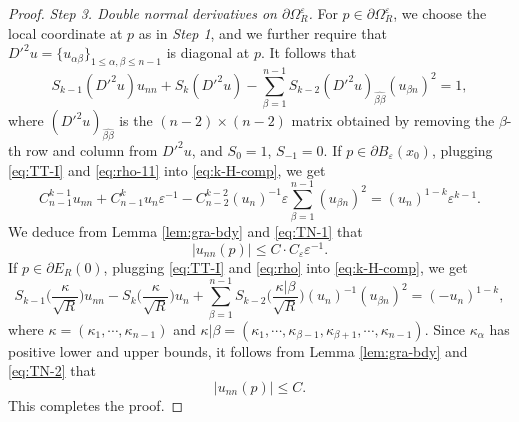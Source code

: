 \documentclass[reqno]{amsart}
\theoremstyle{remark}
\theoremstyle{definition}
\numberwithin{equation}{section}
\begin{document}
\begin{proof}
	\textit{Step 3. Double normal derivatives on $\partial\Omega_R^\varepsilon$.} For $p\in\partial\Omega_R^\varepsilon$, we choose the local coordinate at $p$ as in \textit{Step 1}, and we further require that $D'^2 u = \{u_{\alpha\beta}\}_{1 \leq \alpha, \beta \leq n-1}$ is diagonal at $p$. It follows that
    \begin{equation}\label{eq:k-H-comp}
	S_{k-1}(D'^2 u)u_{nn} + S_k(D'^2 u) - \sum_{\beta=1}^{n-1} S_{k-2}(D'^2 u )_{\widehat{\beta\beta}}(u_{\beta n})^2 = 1, 
	\end{equation}
	where $(D'^2 u)_{\widehat{\beta\beta}}$ is the $(n-2) \times (n-2)$ matrix obtained by removing the $\beta$-th row and column from $D'^2 u$, and $S_0=1$, $S_{-1}=0$. If $p\in\partial B_\varepsilon(x_0)$, plugging \eqref{eq:TT-I} and \eqref{eq:rho-11} into \eqref{eq:k-H-comp}, we get
	\[
	C_{n-1}^{k-1}u_{nn} + C_{n-1}^k u_{n} \varepsilon^{-1}- C_{n-2}^{k-2}(u_n)^{-1}\varepsilon \sum_{\beta=1}^{n-1} (u_{\beta n})^2= (u_n)^{1-k}\varepsilon^{k-1}.
	\]
	We deduce from Lemma \ref{lem:gra-bdy} and \eqref{eq:TN-1} that 
	\[|u_{nn}(p)|\leq C\cdot C_\varepsilon\varepsilon^{-1}.\]
	If $p\in\partial E_R(0)$, plugging \eqref{eq:TT-I} and \eqref{eq:rho} into \eqref{eq:k-H-comp}, we get
	\[
	S_{k-1}\bigg(\frac{\kappa}{\sqrt R}\bigg)u_{nn} - S_k\bigg(\frac{\kappa}{\sqrt R}\bigg) u_{n}+ \sum_{\beta=1}^{n-1}S_{k-2}\bigg(\frac{\kappa|\beta}{\sqrt R}\bigg)(u_n)^{-1}(u_{\beta n})^2= (-u_n)^{1-k},
	\] 
	where $\kappa=(\kappa_1,\cdots,\kappa_{n-1})$ and $\kappa|\beta=(\kappa_1,\cdots,\kappa_{\beta-1},\kappa_{\beta+1},\cdots,\kappa_{n-1})$.
	Since $\kappa_\alpha$ has positive lower and upper bounds,  it follows from Lemma \ref{lem:gra-bdy} and \eqref{eq:TN-2} that 
	\[|u_{nn}(p)|\leq C.\]
	This completes the proof.
\end{proof}
    
\end{document}
